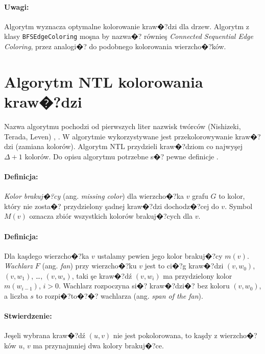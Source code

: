 \documentclass[12pt,a4paper]{mwrep}
\begin{document}
\paragraph{Uwagi:} Algorytm wyznacza optymalne kolorowanie kraw�?dzi
dla drzew.
Algorytm z klasy \lstinline|BFSEdgeColoring| moşna by nazwa�? równieş
\emph{Connected Sequential Edge Coloring},
przez analogi�? do podobnego kolorowania wierzcho�?ków.




\section{Algorytm NTL kolorowania kraw�?dzi}
\label{sec:kolorowanie_krawedzi_NTL}

Nazwa algorytmu pochodzi od pierwszych liter nazwisk twórców 
(Nishizeki, Terada, Leven)
\cite{1983_NTL},
\cite{1985_Gabow}. 
W algorytmie wykorzystywane jest przekolorowywanie kraw�?dzi (zamiana kolorów).
Algorytm NTL przydzieli kraw�?dziom co najwyşej $\Delta + 1$ kolorów.
Do opisu algorytmu potrzebne s�? pewne definicje
\cite{Kubale}.

\paragraph{Definicja:} \emph{Kolor brakuj�?cy} (ang. \emph{missing color})
dla wierzcho�?ka $v$ grafu $G$ to kolor, który nie zosta�?
przydzielony şadnej kraw�?dzi dochodz�?cej do $v$.
Symbol $M(v)$ oznacza zbiór wszystkich kolorów brakuj�?cych dla $v$.

\paragraph{Definicja:} Dla kaşdego wierzcho�?ka $v$ ustalamy pewien
jego kolor brakuj�?cy $m(v)$. 
\emph{Wachlarz} $F$ (ang. \emph{fan}) przy wierzcho�?ku $v$ jest to ci�?g 
kraw�?dzi $(v,w_0)$, $(v,w_1)$, \ldots, $(v,w_s)$, taki şe kraw�?dź
$(v,w_i)$ ma przydzielony kolor $m(w_{i-1})$, $i > 0$.
Wachlarz rozpoczyna si�? kraw�?dzi�? bez koloru $(v,w_0)$, a liczba $s$
to rozpi�?to�?�? wachlarza (ang. \emph{span of the fan}).

\paragraph{Stwierdzenie:} Jeşeli wybrana kraw�?dź $(u,v)$ nie jest
pokolorowana, to kaşdy z wierzcho�?ków $u$, $v$ ma przynajmniej
dwa kolory brakuj�?ce.
\end{document}
